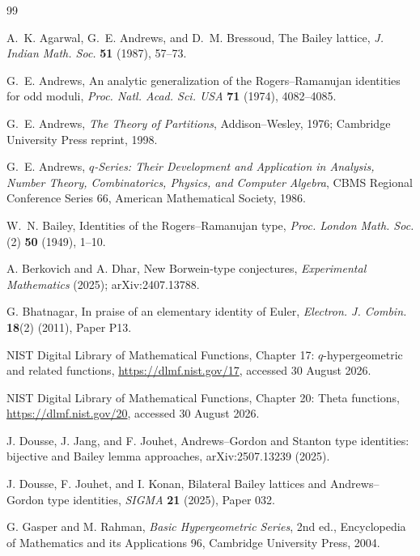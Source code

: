 \documentclass[11pt]{article}
\theoremstyle{blueplain}
\theoremstyle{bluedef}
\begin{document}
\begin{thebibliography}{99}

A.~K. Agarwal, G.~E. Andrews, and D.~M. Bressoud,
\newblock The Bailey lattice,
\newblock \emph{J. Indian Math. Soc.} \textbf{51} (1987), 57--73.

G.~E. Andrews,
\newblock An analytic generalization of the Rogers--Ramanujan identities for odd moduli,
\newblock \emph{Proc. Natl. Acad. Sci. USA} \textbf{71} (1974), 4082--4085.

G.~E. Andrews,
\newblock \emph{The Theory of Partitions},
\newblock Addison--Wesley, 1976; Cambridge University Press reprint, 1998.

G.~E. Andrews,
\newblock \emph{$q$-Series: Their Development and Application in Analysis, Number Theory, Combinatorics, Physics, and Computer Algebra},
\newblock CBMS Regional Conference Series 66, American Mathematical Society, 1986.

W.~N. Bailey,
\newblock Identities of the Rogers--Ramanujan type,
\newblock \emph{Proc. London Math. Soc.} (2) \textbf{50} (1949), 1--10.

A. Berkovich and A. Dhar,
\newblock New Borwein-type conjectures,
\newblock \emph{Experimental Mathematics} (2025); arXiv:2407.13788.

G. Bhatnagar,
\newblock In praise of an elementary identity of Euler,
\newblock \emph{Electron. J. Combin.} \textbf{18}(2) (2011), Paper P13.

NIST Digital Library of Mathematical Functions,
\newblock Chapter 17: $q$-hypergeometric and related functions,
\newblock \url{https://dlmf.nist.gov/17}, accessed 30 August 2026.

NIST Digital Library of Mathematical Functions,
\newblock Chapter 20: Theta functions,
\newblock \url{https://dlmf.nist.gov/20}, accessed 30 August 2026.

J. Dousse, J. Jang, and F. Jouhet,
\newblock Andrews--Gordon and Stanton type identities: bijective and Bailey lemma approaches,
\newblock arXiv:2507.13239 (2025).

J. Dousse, F. Jouhet, and I. Konan,
\newblock Bilateral Bailey lattices and Andrews--Gordon type identities,
\newblock \emph{SIGMA} \textbf{21} (2025), Paper 032.

G. Gasper and M. Rahman,
\newblock \emph{Basic Hypergeometric Series}, 2nd ed.,
\newblock Encyclopedia of Mathematics and its Applications 96, Cambridge University Press, 2004.


\end{thebibliography}
\end{document}

